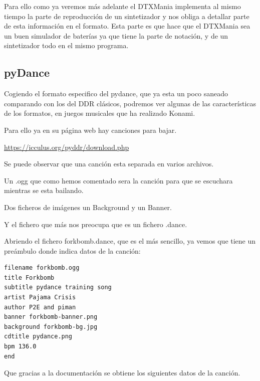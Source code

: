 \documentclass[a4paper,11pt,oneside]{book}
\begin{document}
Para ello como ya veremos más adelante el DTXMania implementa al mismo tiempo la parte de reproducción de un sintetizador y nos obliga a detallar parte de esta información en el formato. Esta parte es que hace que el DTXMania sea un buen simulador de baterías ya que tiene la parte de notación, y de un sintetizador todo en el mismo programa.


\subsection{pyDance}
Cogiendo el formato especifico del pydance, que ya esta un poco saneado comparando con los del DDR clásicos, podremos ver algunas de las características de los formatos, en juegos musicales que ha realizado Konami.

Para ello ya en su página web hay canciones para bajar.


\url{https://icculus.org/pyddr/download.php}

Se puede observar que una canción esta separada en varios archivos.

Un .ogg que como hemos comentado sera la canción para que se escuchara mientras se esta bailando.

Dos ficheros de imágenes un Background y un Banner.

Y el fichero que más nos preocupa que es un fichero .dance.

Abriendo el fichero forkbomb.dance, que es el más sencillo, ya vemos que tiene un preámbulo donde indica datos de la canción:


\begin{Verbatim}[frame=single]
filename forkbomb.ogg
title Forkbomb 
subtitle pydance training song
artist Pajama Crisis
author P2E and piman
banner forkbomb-banner.png
background forkbomb-bg.jpg
cdtitle pydance.png
bpm 136.0
end
\end{Verbatim}

Que gracias a la documentación se obtiene los siguientes datos de la canción.
\end{document}
